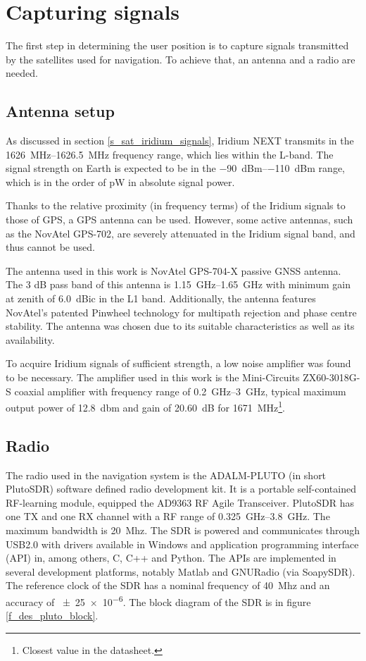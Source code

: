 \section{Capturing signals}
The first step in determining the user position is to capture signals transmitted by the satellites used for navigation. To achieve that, an antenna and a radio are needed.

\subsection{Antenna setup}
As discussed in section \ref{s_sat_iridium_signals}, Iridium NEXT transmits in the \qtyrange{1626}{1626.5}{\MHz} frequency range, which lies within the L-band. The signal strength on Earth is expected to be in the \qtyrange{-90}{-110}{dBm} range\cite{sop01}, which is in the order of \unit{pW} in absolute signal power.

Thanks to the relative proximity (in frequency terms) of the Iridium signals to those of GPS, a GPS antenna can be used. However, some active antennas, such as the NovAtel GPS-702\cite{des03}, are severely attenuated in the Iridium signal band, and thus cannot be used.

The antenna used in this work is NovAtel GPS-704-X passive GNSS antenna. 
The 3 dB pass band of this antenna is \qtyrange{1.15}{1.65}{GHz} with minimum gain at zenith of \qty{+6.0}{dBic} in the L1 band. Additionally, the antenna features NovAtel’s patented Pinwheel technology for multipath rejection and phase centre stability\cite{des04}. The antenna was chosen due to its suitable characteristics as well as its availability.

To acquire Iridium signals of sufficient strength, a low noise amplifier was found to be necessary. The amplifier used in this work is the Mini-Circuits ZX60-3018G-S coaxial amplifier with frequency range of \qtyrange{0.2}{3}{GHz}, typical maximum output power of \qty{+12.8}{dbm} and gain of \qty{20.60}{dB} for \qty{1671}{MHz}\footnote{Closest value in the datasheet.}\cite{des06}.

\subsection{Radio}
The radio used in the navigation system is the ADALM-PLUTO (in short PlutoSDR) software defined radio development kit. It is a portable self-contained RF-learning module, equipped the AD9363 RF Agile Transceiver. PlutoSDR has one TX and one RX channel with a RF range of \qtyrange{0.325}{3.8}{GHz}. The maximum bandwidth is \qty{20}{Mhz}. The SDR is powered and communicates through USB2.0 with drivers available in Windows and application programming interface (API) in, among others, C, C++ and Python. The APIs are implemented in several development platforms, notably Matlab and GNURadio (via SoapySDR). The reference clock of the SDR has a nominal frequency of \qty{40}{Mhz} and an accuracy of \num{\pm25e-6}\cite{des05}. The block diagram of the SDR is in figure \ref{f_des_pluto_block}.

